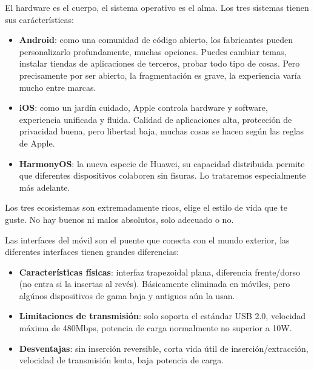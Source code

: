 
El hardware es el cuerpo, el sistema operativo es el alma. Los tres sistemas tienen sus carácterísticas:

\begin{itemize}
  \item \textbf{Android}: como una comunidad de código abierto, los fabricantes pueden personalizarlo profundamente, muchas opciones. Puedes cambiar temas, instalar tiendas de aplicaciones de terceros, probar todo tipo de cosas. Pero precisamente por ser abierto, la fragmentación es grave, la experiencia varía mucho entre marcas.
  \item \textbf{iOS}: como un jardín cuidado, Apple controla hardware y software, experiencia unificada y fluida. Calidad de aplicaciones alta, protección de privacidad buena, pero libertad baja, muchas cosas se hacen según las reglas de Apple.
  \item \textbf{HarmonyOS}: la nueva especie de Huawei, su capacidad distribuida permite que diferentes dispositivos colaboren sin fisuras. Lo trataremos especialmente más adelante.
\end{itemize}

Los tres ecosistemas son extremadamente ricos, elige el estilo de vida que te guste. No hay buenos ni malos absolutos, solo adecuado o no.


Las interfaces del móvil son el puente que conecta con el mundo exterior, las diferentes interfaces tienen grandes diferencias:


\begin{itemize}
  \item \textbf{Características físicas}: interfaz trapezoidal plana, diferencia frente/dorso (no entra si la insertas al revés). Básicamente eliminada en móviles, pero algúnos dispositivos de gama baja y antiguos aún la usan.
  \item \textbf{Limitaciones de transmisión}: solo soporta el estándar USB 2.0, velocidad máxima de 480Mbps, potencia de carga normalmente no superior a 10W.
  \item \textbf{Desventajas}: sin inserción reversible, corta vida útil de inserción/extracción, velocidad de transmisión lenta, baja potencia de carga.
\end{itemize}

